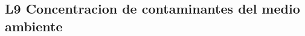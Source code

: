 \documentclass[12pt,addpoints]{evalua}
\begin{document}
\begin{questions}
	\section*{L9 Concentracion de contaminantes del medio ambiente}










\end{questions}
\end{document}
